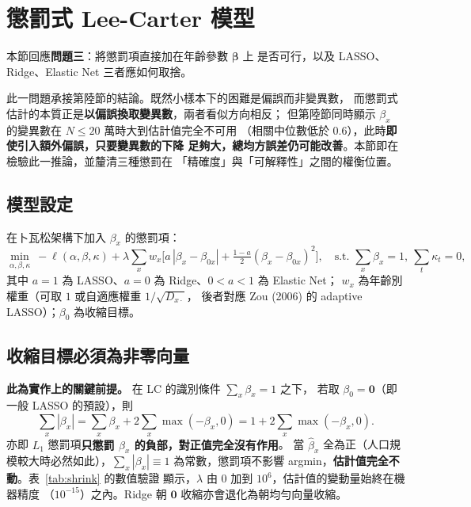 \documentclass[UTF8, fontset=macnew, a4paper, 12pt]{ctexart}
\begin{document}
\section{懲罰式 Lee-Carter 模型}

本節回應\textbf{問題三}：將懲罰項直接加在年齡參數 $\boldsymbol{\beta}$ 上
是否可行，以及 LASSO、Ridge、Elastic Net 三者應如何取捨。

此一問題承接第陸節的結論。既然小樣本下的困難是偏誤而非變異數，
而懲罰式估計的本質正是\textbf{以偏誤換取變異數}，兩者看似方向相反；
但第陸節同時顯示 $\beta_x$ 的變異數在 $N\le20$ 萬時大到估計值完全不可用
（相關中位數低於 0.6），此時\textbf{即使引入額外偏誤，只要變異數的下降
足夠大，總均方誤差仍可能改善}。本節即在檢驗此一推論，並釐清三種懲罰在
「精確度」與「可解釋性」之間的權衡位置。

\subsection{模型設定}

在卜瓦松架構下加入 $\beta_x$ 的懲罰項：
\begin{equation}
\min_{\alpha,\beta,\kappa}\ -\ell(\alpha,\beta,\kappa)
+\lambda\sum_x w_x\Big[a\,|\beta_x-\beta_{0x}|
+\tfrac{1-a}{2}(\beta_x-\beta_{0x})^2\Big],
\quad \text{s.t. } \sum_x\beta_x=1,\ \sum_t\kappa_t=0,
\end{equation}
其中 $a=1$ 為 LASSO、$a=0$ 為 Ridge、$0<a<1$ 為 Elastic Net；
$w_x$ 為年齡別權重（可取 $1$ 或自適應權重 $1/\sqrt{D_{x\cdot}}$，
後者對應 Zou (2006) 的 adaptive LASSO）；$\beta_0$ 為收縮目標。

\subsection{收縮目標必須為非零向量}\label{sec:degenerate}

\textbf{此為實作上的關鍵前提。} 在 LC 的識別條件 $\sum_x\beta_x=1$ 之下，
若取 $\beta_0=\mathbf{0}$（即一般 LASSO 的預設），則
\begin{equation}
\sum_x|\beta_x|=\sum_x\beta_x+2\sum_x\max(-\beta_x,0)
=1+2\sum_x\max(-\beta_x,0).
\end{equation}
亦即 $L_1$ 懲罰項\textbf{只懲罰 $\beta_x$ 的負部，對正值完全沒有作用}。
當 $\hat\beta_x$ 全為正（人口規模較大時必然如此），$\sum_x|\beta_x|\equiv1$
為常數，懲罰項不影響 argmin，\textbf{估計值完全不動}。表~\ref{tab:shrink} 的數值驗證
顯示，$\lambda$ 由 $0$ 加到 $10^6$，估計值的變動量始終在機器精度
（$10^{-15}$）之內。Ridge 朝 $\mathbf{0}$ 收縮亦會退化為朝均勻向量收縮。
\end{document}
